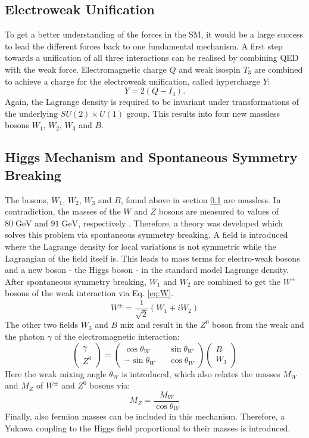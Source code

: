 	\subsection{Electroweak Unification}
	\label{sec:elw}	
	To get a better understanding of the forces in the SM, it would be a large success to lead the different forces back to one fundamental mechanism. A first step towards a unification of all three interactions can be realised by combining QED with the weak force. Electromagnetic charge $Q$ and weak isospin $T_3$ are combined to achieve a charge for the electroweak unification, called hypercharge $Y$:
	\begin{equation}
	Y = 2(Q-I_3).
	\end{equation}
	Again, the Lagrange density is required to be invariant under transformations of the underlying $SU(2) \times U(1)$ group. This results into four new massless bosons $W_1$, $W_2$, $W_3$ and $B$. 
	\subsection{Higgs Mechanism and Spontaneous Symmetry Breaking}
	\label{sec:higgs}
	The bosons, $W_1$, $W_2$, $W_3$ and $B$, found above in section \ref{sec:elw} are massless. In contradiction, the masses of the $W$ and $Z$ bosons are measured to values of $80\;\text{GeV}$ and $91\;\text{GeV}$, respectively \cite{pdg2016}. Therefore, a theory was developed which solves this problem via spontaneous symmetry breaking. A field is introduced where the Lagrange density for local variations is not symmetric while the Lagrangian of the field itself is. This leads to mass terms for electro-weak bosons and a new boson - the Higgs boson - in the standard model Lagrange density. After spontaneous symmetry breaking, $W_1$ and $W_2$ are combined to get the $W^\pm$ bosons of the weak interaction via Eq. \ref{eq:W}.
	\begin{equation}
	W^\pm = \frac{1}{\sqrt{2}}(W_1 \mp i W_2)
	\label{eq:W}
	\end{equation}
	The other two fields $W_3$ and $B$ mix and result in the $Z^0$ boson from the weak and the photon $\gamma$ of the electromagnetic interaction:
	\begin{equation}
	\begin{pmatrix}\gamma \\ Z^0\end{pmatrix} =
	\begin{pmatrix}
	\cos \theta_W && \sin \theta_W \\
	-\sin \theta_W && \cos \theta_W 
	\end{pmatrix}
	\begin{pmatrix}B \\ W_3\end{pmatrix}
	\label{eq:Z}
	\end{equation}	
	Here the weak mixing angle $\theta_W$ is introduced, which also relates the masses $M_W$ and $M_Z$ of $W^\pm$ and $Z^0$ bosons via:
	\begin{equation}
	M_Z = \frac{M_W}{\cos \theta_W}
	\end{equation}
	Finally, also fermion masses can be included in this mechanism. Therefore, a Yukawa coupling to the Higgs field proportional to their masses is introduced. 
	
